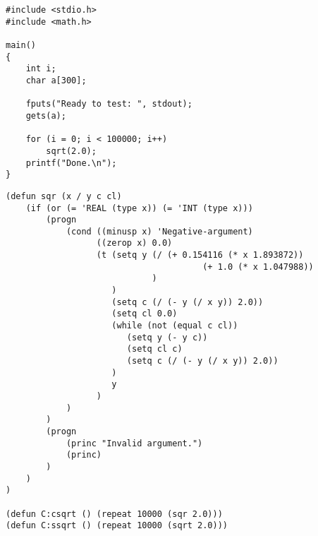 \begin{verbatim}
#include <stdio.h>
#include <math.h>

main()
{
    int i;
    char a[300];

    fputs("Ready to test: ", stdout);
    gets(a);

    for (i = 0; i < 100000; i++)
        sqrt(2.0);
    printf("Done.\n");
}
\end{verbatim}
\clearpage
\centerline{}

\begin{verbatim}
(defun sqr (x / y c cl)
    (if (or (= 'REAL (type x)) (= 'INT (type x)))
        (progn
            (cond ((minusp x) 'Negative-argument)
                  ((zerop x) 0.0)
                  (t (setq y (/ (+ 0.154116 (* x 1.893872))
                                       (+ 1.0 (* x 1.047988))
                             )
                     )
                     (setq c (/ (- y (/ x y)) 2.0))
                     (setq cl 0.0)
                     (while (not (equal c cl))
                        (setq y (- y c))
                        (setq cl c)
                        (setq c (/ (- y (/ x y)) 2.0))
                     )
                     y
                  )
            )
        )
        (progn
            (princ "Invalid argument.")
            (princ)
        )
    )
)

(defun C:csqrt () (repeat 10000 (sqr 2.0)))
(defun C:ssqrt () (repeat 10000 (sqrt 2.0)))
\end{verbatim}
